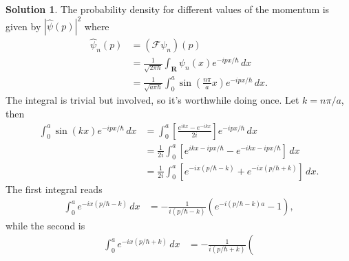 \documentclass[a4paper]{article}
\DeclareMathOperator{\R}{\mathbf{R}}
\theoremstyle{definition}
\newtheorem*{sol}{Solution}
\begin{document}
\begin{enumerate}
            \begin{sol}
                The probability density for different
                values of the momentum is given by
                $|\hat{\psi}(p)|^2$ where
                \begin{align}
                    \hat{\psi}_n(p)
                    &= (\mathcal{F} \psi_n)(p) \\
                    &= \frac{1}{\sqrt{2\pi \hbar}}\int_{\R}
                    \psi_n(x) e^{-i px / \hbar} \, dx
                    \\
                    &= \frac{1}{\sqrt{a\pi\hbar}}
                    \int_{0}^{a} \sin\left( \frac{n\pi}{a} x
                    \right) e^{-ipx / \hbar} \, dx.
                \end{align}
                The integral is trivial but involved, so
                it's worthwhile doing once. Let $k = n\pi /
                a$, then
                \begin{align}
                    \int_0^{a} \sin(kx) e^{-ipx / \hbar} \,
                    dx
                    &= \int_0^{a} \left[
                        \frac{e^{ikx} - e^{-ikx}}{2i}
                    \right] e^{-ipx / \hbar} \, dx \\
                    &= \frac{1}{2i} \int_0^{a}
                    \left[ e^{ikx - ipx
                    / \hbar} - e^{-ikx - ipx / \hbar}
                    \right] \, dx \\
                    &= \frac{1}{2i} \int_0^{a} \left[
                        e^{-ix(p / \hbar-k)}
                        + e^{-ix(p / \hbar+k)}
                    \right] \, dx.
                \end{align}
                The first integral reads 
                \begin{align}
                    \int_0^{a} e^{-ix(p / \hbar - k)} \, dx
                    &= -\frac{1}{i(p/\hbar - k)} \left(
                    e^{-i(p / \hbar - k)a} - 1 \right),
                \end{align}
                while the second is
                \begin{align}
                    \int_0^{a} e^{-ix(p / \hbar + k)} \, dx
                    &= -\frac{1}{i(p/\hbar + k)} \left(

\end{align}
\end{sol}
\end{enumerate}
\end{document}
